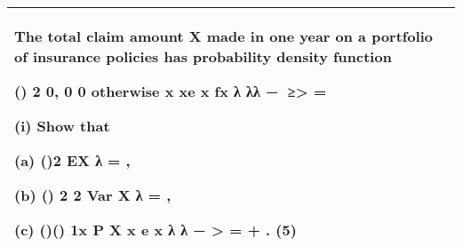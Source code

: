 \documentclass[a4paper,12pt]{article}
\begin{document}
\begin{table}[ht!]
     \centering
     \begin{tabular}{|p{15cm}|}
     \hline        
The total claim amount X made in one year on a portfolio of insurance policies has probability density function 
 
 ()
2 0, 0 0 otherwise x xe x
fx
λ λλ − ≥> =  
 
 
(i) Show that 
 
 (a) ()2 EX λ = , 
 
 (b) () 2 2 Var X λ = , 
 
 (c) ()() 1x P X x e x λ λ − > = + . 
(5) 
 
\\ \hline
      \end{tabular}
    \end{table}
    
\end{document}
